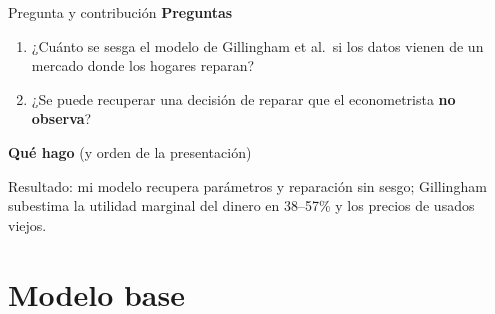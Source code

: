 \documentclass[aspectratio=169,11pt]{beamer}
\newcommand{\idea}[1]{\vspace{-0.3em}\begin{block}{}\centering\small #1\end{block}}
\begin{document}
\begin{frame}{Pregunta y contribución}
  \textbf{Preguntas}
  \begin{enumerate}
    \item ¿Cuánto se sesga el modelo de Gillingham et al.\ si los datos vienen de un
          mercado donde los hogares reparan?
    \item ¿Se puede recuperar una decisión de reparar que el econometrista \textbf{no
          observa}?
  \end{enumerate}
  \vspace{0.6em}
  \textbf{Qué hago} (y orden de la presentación)
  \par\smallskip
  \centering
  \idea{Resultado: mi modelo recupera parámetros y reparación sin sesgo; Gillingham
  subestima la utilidad marginal del dinero en 38--57\% y los precios de usados viejos.}
\end{frame}

\section{Modelo base}
\end{document}
